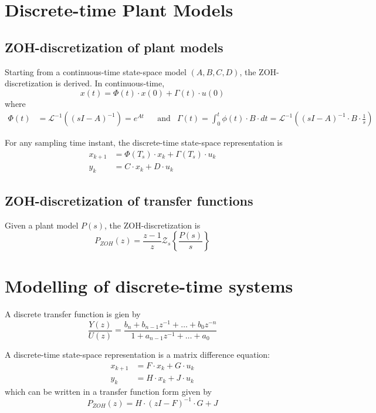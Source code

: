 
\section{Discrete-time Plant Models}

\subsection{ZOH-discretization of plant models}
Starting from a continuous-time state-space model $(A,B,C,D)$, the ZOH-discretization is derived.
In continuous-time,
\[
    x(t) = \Phi(t) \cdot x(0) + \Gamma(t) \cdot u(0)
\]
where
\begin{align*}
    \Phi(t) &= \mathcal{L}^{-1} \left( (sI-A)^{-1} \right) = e^{At} &
    & \text{and} &
    \Gamma(t) = \int_0^t \phi(t) \cdot B \cdot dt = \mathcal{L}^{-1} \left((sI-A)^{-1} \cdot B \cdot \frac{1}{s}\right)
\end{align*}

For any sampling time instant, the discrete-time state-space representation is
\begin{align*}
    x_{k+1} &= \Phi(T_s) \cdot x_k + \Gamma(T_s) \cdot u_k \\
    y_k &= C \cdot x_k + D \cdot u_k
\end{align*}

\subsection{ZOH-discretization of transfer functions}
Given a plant model $P(s)$, the ZOH-discretization is
\[
    P_{ZOH}(z) = \frac{z-1}{z}\mathcal{Z}_s\left\{ \frac{P(s)}{s} \right\}
\]

\section{Modelling of discrete-time systems}
A discrete transfer function is gien by
\[
    \frac{Y(z)}{U(z)} = \frac{b_n + b_{n-1}z^{-1}+ \dots + b_0z^{-n}}{1 + a_{n-1}z^{-1} + \dots + a_0}
\]

A discrete-time state-space representation is a matrix difference equation:
\begin{align*}
    x_{k+1} &= F \cdot x_k + G \cdot u_k \\
    y_k &= H \cdot x_k + J \cdot u_k
\end{align*}
which can be written in a transfer function form given by
\[
    P_{ZOH}(z) = H \cdot (zI - F)^{-1} \cdot G + J
\]

